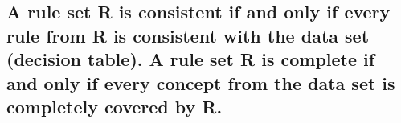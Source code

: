 \documentclass[10pt]{amsart}
\begin{document}
\subsection*{A rule set R is consistent if and only if every rule from R is consistent with the data set (decision table).  A rule set R is complete if and only if every concept from the data set is completely covered by R.}
\end{document}
